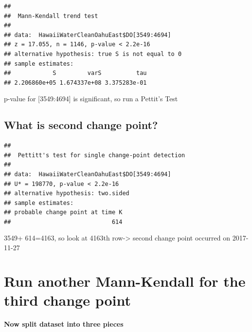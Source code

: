\documentclass[12pt,]{article}
\newenvironment{Shaded}{\begin{snugshade}}{\end{snugshade}}
\newcommand{\KeywordTok}[1]{\textcolor[rgb]{0.13,0.29,0.53}{\textbf{#1}}}
\newcommand{\DecValTok}[1]{\textcolor[rgb]{0.00,0.00,0.81}{#1}}
\newcommand{\OperatorTok}[1]{\textcolor[rgb]{0.81,0.36,0.00}{\textbf{#1}}}
\newcommand{\NormalTok}[1]{#1}
\let\oldparagraph\paragraph
\renewcommand{\paragraph}[1]{\oldparagraph{#1}\mbox{}}
\begin{document}
\begin{verbatim}
## 
##  Mann-Kendall trend test
## 
## data:  HawaiiWaterCleanOahuEast$DO[3549:4694]
## z = 17.055, n = 1146, p-value < 2.2e-16
## alternative hypothesis: true S is not equal to 0
## sample estimates:
##            S         varS          tau 
## 2.206860e+05 1.674337e+08 3.375283e-01
\end{verbatim}

p-value for {[}3549:4694{]} is significant, so run a Pettit's Test

\subsection{What is second change
point?}\label{what-is-second-change-point-2}

\begin{Shaded}
\end{Shaded}

\begin{verbatim}
## 
##  Pettitt's test for single change-point detection
## 
## data:  HawaiiWaterCleanOahuEast$DO[3549:4694]
## U* = 198770, p-value < 2.2e-16
## alternative hypothesis: two.sided
## sample estimates:
## probable change point at time K 
##                             614
\end{verbatim}

3549+ 614=4163, so look at 4163th row-\textgreater{} second change point
occurred on 2017-11-27

\section{Run another Mann-Kendall for the third change
point}\label{run-another-mann-kendall-for-the-third-change-point}

\paragraph{Now split dataset into three
pieces}\label{now-split-dataset-into-three-pieces-3}

\begin{Shaded}
\end{Shaded}
\end{document}
